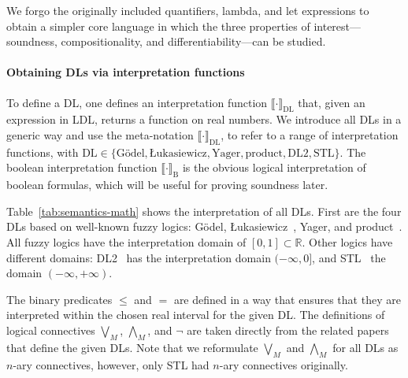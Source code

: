 \documentclass[a4paper,UKenglish,cleveref, autoref, thm-restate]{lipics-v2021}
\newcommand{\Real}{{\mathbb R}}
\newcommand{\naryConj}{\bigwedge\nolimits_M}
\newcommand{\naryDisj}{\bigvee\nolimits_M}
\def\DL{\textrm{DL}}
\def\DLtwo{\textrm{DL2}}
\def\STL{\textrm{STL}}
\def\product{\textrm{product}}
\def\Yager{\textrm{Yager}}
\def\Luka{\textrm{Łukasiewicz}}
\def\Godel{\textrm{Gödel}}
\newcommand{\tbool}[1]{\llbracket #1 \rrbracket_{\textrm{B}}}
\newcommand{\tempty}[1]{\llbracket #1 \rrbracket}
\begin{document}
We forgo the originally included quantifiers, lambda, and 
let expressions to obtain a simpler core language in which
the three properties of interest---soundness, compositionality, and differentiability---can be studied. 
 
\paragraph*{Obtaining DLs via interpretation functions}
To define a DL, one defines an interpretation function $\tempty{\cdot}_{\DL}$ that, given an expression in LDL, 
returns a function on real numbers.  We introduce all DLs in a generic way and use the meta-notation
$\tempty{\cdot}_{\DL}$, to refer to a range of interpretation functions, with
$\DL \in \{\Godel, \Luka, \Yager, \product, \DLtwo, \STL\}$.
The boolean interpretation function $\tbool{\cdot}$ is the obvious 
logical interpretation of boolean formulas, which will be useful for proving 
soundness later.
 
Table~\ref{tab:semantics-math} shows the interpretation of all
DLs. First are the four DLs based on well-known fuzzy logics: \Godel,
\Luka~\cite{lukasiewicz1920three}, \Yager{}, and \product{}~\cite{van2022analyzing}.
All fuzzy logics have the interpretation domain of $[0,1] \subset \Real$.  Other logics have
different domains: \DLtwo~\cite{fischer2019dl2} has the interpretation
domain $(- \infty , 0] $, and \STL~\cite{varnai} the domain $(-\infty, +\infty)$.

The binary predicates $\leq$ and $=$ are defined in a way that ensures that they are interpreted within 
the chosen real interval for the  given DL.  The definitions of logical 
connectives $\naryDisj$, $\naryConj$, and $\neg$ are taken directly 
from the related papers that define the given DLs. Note that we reformulate 
$\naryDisj$ and $\naryConj$ for all DLs as $n$-ary connectives, 
however, only \STL{} had $n$-ary connectives originally. 

\newcommand{\topline}{\arrayrulecolor{black}\specialrule{0.1em}{\abovetopsep}{0pt}%
	\arrayrulecolor{lightgray}\specialrule{\belowrulesep}{0pt}{0pt}%
	\arrayrulecolor{black}
}

\newcommand{\midline}{\arrayrulecolor{lightgray}\specialrule{\aboverulesep}{-1pt}{0pt}%
	\arrayrulecolor{black}\specialrule{\lightrulewidth}{0pt}{0pt}%
	\arrayrulecolor{white}\specialrule{\belowrulesep}{0pt}{0pt}%
	\arrayrulecolor{black}
}
\end{document}
